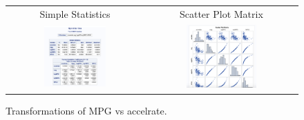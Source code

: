 \documentclass[acmsmall]{acmart}
\begin{document}
\begin{figure}[H] %
	\centering
	\begin{tabular}{p{} p{}}
	\hline
	\multicolumn{1}{|c|}{Simple Statistics} & \multicolumn{1}{|c|}{Scatter Plot Matrix} \\
		\multicolumn{1}{|c|}{\includegraphics[width=0.48\textwidth]{../graphics/PearsonTransform1}} &
		\multicolumn{1}{|c|}{\includegraphics[width=0.48\textwidth]{../graphics/PearsonTransform2}}\\
		\hline
	\end{tabular}		
	\caption{Transformations of MPG vs accelrate.} %
	\label{fig:TFPC}
\end{figure}
\end{document}
